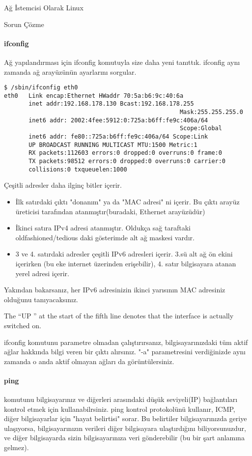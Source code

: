 \begin{section}{Ağ İstemcisi Olarak Linux}
\begin{subsection}{Sorun Çözme}
\paragraph{ifconfig}{ Ağ yapılandırması için ifconfig komutuyla size daha yeni tanıttık. ifconfig aynı zamanda ağ arayüzünün ayarlarını sorgular.}
\begin{verbatim}
$ /sbin/ifconfig eth0
eth0   Link encap:Ethernet HWaddr 70:5a:b6:9c:40:6a
       inet addr:192.168.178.130 Bcast:192.168.178.255 
                                                  Mask:255.255.255.0
       inet6 addr: 2002:4fee:5912:0:725a:b6ff:fe9c:406a/64
                                                  Scope:Global
       inet6 addr: fe80::725a:b6ff:fe9c:406a/64 Scope:Link
       UP BROADCAST RUNNING MULTICAST MTU:1500 Metric:1
       RX packets:112603 errors:0 dropped:0 overruns:0 frame:0
       TX packets:98512 errors:0 dropped:0 overruns:0 carrier:0
       collisions:0 txqueuelen:1000
\end{verbatim}

Çeşitli adresler daha ilginç bitler içerir.

\begin{itemize}
\item İlk satırdaki çıktı "donanım" ya da "MAC adresi" ni içerir. Bu çıktı arayüz üreticisi tarafından atanmıştır(buradaki, Ethernet arayüzüdür)
\item İkinci satıra IPv4 adresi atanmıştır. Oldukça sağ taraftaki oldfashioned/tedious daki gösterimde alt ağ maskesi vardır. 
\item 3 ve 4. satırdaki adresler çeşitli IPv6 adresleri içerir. 3.sü alt ağ ön  ekini içerirken (bu eke internet üzerinden erişebilir), 4. satır bilgisayara atanan yerel adresi içerir.
\end{itemize}

Yakından bakarsanız, her IPv6 adresinizin ikinci yarısının MAC adresiniz olduğunu tanıyacaksınız.

The “UP ” at the start of the fifth line denotes that the interface is actually switched on.

ifconfig komutunu parametre olmadan çalıştırırsanız, bilgisayarınızdaki tüm aktif ağlar hakkında bilgi veren bir çıktı alırsınız. "-a" parametresini verdiğinizde aynı zamanda o anda aktif olmayan ağları da görüntülersiniz.

\paragraph{ping}{komutunu bilgisayarınız ve diğerleri arasındaki düşük seviyeli(IP) bağlantıları kontrol etmek için kullanabilrsiniz. ping kontrol protokolünü kullanır, ICMP, diğer bilgisayarlar için "hayat belirtisi" sorar. Bu belirtiler bilgisayarınızda geriye ulaşıyorsa, bilgisayarınızın verileri diğer bilgisayara ulaştırdığını biliyorsunuzdur, ve diğer bilgisayarda sizin bilgisayarınıza veri gönderebilir (bu bir şart anlamına gelmez).}


\end{subsection}
\end{section}
